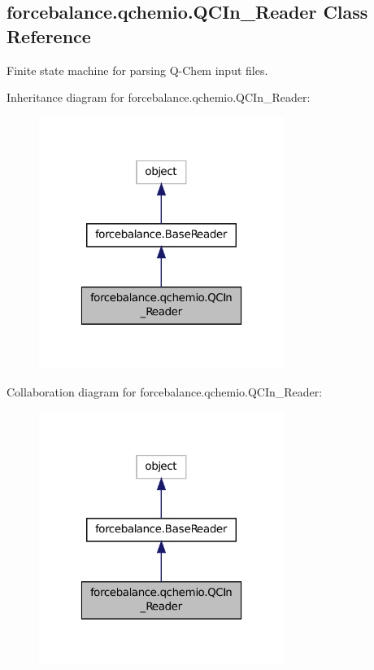 \hypertarget{classforcebalance_1_1qchemio_1_1QCIn__Reader}{\subsection{forcebalance.\-qchemio.\-Q\-C\-In\-\_\-\-Reader Class Reference}
\label{classforcebalance_1_1qchemio_1_1QCIn__Reader}
}


Finite state machine for parsing Q-\/\-Chem input files.  




Inheritance diagram for forcebalance.\-qchemio.\-Q\-C\-In\-\_\-\-Reader\-:
\nopagebreak
\begin{figure}[H]
\begin{center}
\leavevmode
\includegraphics[width=226pt]{classforcebalance_1_1qchemio_1_1QCIn__Reader__inherit__graph}
\end{center}
\end{figure}


Collaboration diagram for forcebalance.\-qchemio.\-Q\-C\-In\-\_\-\-Reader\-:
\nopagebreak
\begin{figure}[H]
\begin{center}
\leavevmode
\includegraphics[width=226pt]{classforcebalance_1_1qchemio_1_1QCIn__Reader__coll__graph}
\end{center}
\end{figure}
